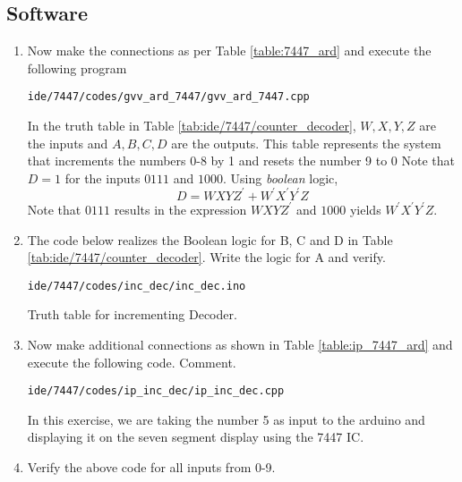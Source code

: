 \subsection{Software}
\begin{enumerate}[label=\arabic*.,ref=\theenumi]
\item
Now make the connections as per Table \ref{table:7447_ard}  and execute the following program 
\begin{lstlisting}
ide/7447/codes/gvv_ard_7447/gvv_ard_7447.cpp
\end{lstlisting}

\begin{table}[H]
\centering

\caption{}
\label{table:7447_ard}
\end{table}
In the  truth table in Table \ref{tab:ide/7447/counter_decoder},  $W,X,Y,Z$ are the inputs
and $A,B,C,D$ are the outputs. This table represents the system that increments the numbers 0-8 by 1 and resets the number 9 to 0
%
Note that  $D = 1$ for the inputs $0111$ and $1000$.  Using {\em boolean} logic,
%
\begin{equation}
\label{bool_logic}
D = WXYZ^{'} + W^{'}X^{'}Y^{'}Z
\end{equation}
%
Note that $0111$ results in the expression $WXYZ^{'}$ and $1000$ yields $W^{'}X^{'}Y^{'}Z$. 
%
\item
The code below realizes the Boolean logic for B, C and D in  Table \ref{tab:ide/7447/counter_decoder}.  Write the logic for A and verify.
\begin{lstlisting}
ide/7447/codes/inc_dec/inc_dec.ino
\end{lstlisting}

\begin{table*}[!t]
\centering

\caption{Truth table for incrementing Decoder.}
\label{tab:ide/7447/counter_decoder}
\end{table*}
\item
Now make additional connections as shown in Table \ref{table:ip_7447_ard} and execute the following code.  Comment.
%			
\begin{lstlisting}
ide/7447/codes/ip_inc_dec/ip_inc_dec.cpp
\end{lstlisting}

\solution
In this exercise, we are taking the number 5 as input to the arduino and displaying it on the seven segment display using the 7447 IC.
\begin{table}[H]
\centering

\caption{}
\label{table:ip_7447_ard}
\end{table}
\item
Verify the above code for all inputs from 0-9.


\end{enumerate}
